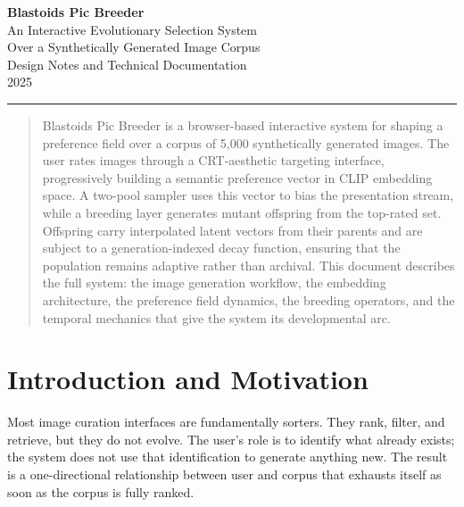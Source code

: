 \documentclass[12pt, a4paper]{article}
\begin{document}
\begin{center}
  {\Large\bfseries\color{termgreen!90!black} Blastoids Pic Breeder}\\[0.6em]
  {\large\color{commentgray} An Interactive Evolutionary Selection System\\
  Over a Synthetically Generated Image Corpus}\\[1.2em]
  {\normalsize\color{commentgray} Design Notes and Technical Documentation}\\[0.4em]
  {\small\color{commentgray!70} 2025}
\end{center}

\vspace{1em}
\hrule height 0.5pt
\vspace{1.5em}

\begin{abstract}
\noindent
Blastoids Pic Breeder is a browser-based interactive system for shaping a preference field over a corpus of 5,000 synthetically generated images. The user rates images through a CRT-aesthetic targeting interface, progressively building a semantic preference vector in CLIP embedding space. A two-pool sampler uses this vector to bias the presentation stream, while a breeding layer generates mutant offspring from the top-rated set. Offspring carry interpolated latent vectors from their parents and are subject to a generation-indexed decay function, ensuring that the population remains adaptive rather than archival. This document describes the full system: the image generation workflow, the embedding architecture, the preference field dynamics, the breeding operators, and the temporal mechanics that give the system its developmental arc.
\end{abstract}

\vspace{1em}

\tableofcontents

\newpage

\section{Introduction and Motivation}

Most image curation interfaces are fundamentally sorters. They rank, filter, and retrieve, but they do not evolve. The user's role is to identify what already exists; the system does not use that identification to generate anything new. The result is a one-directional relationship between user and corpus that exhausts itself as soon as the corpus is fully ranked.
\end{document}
